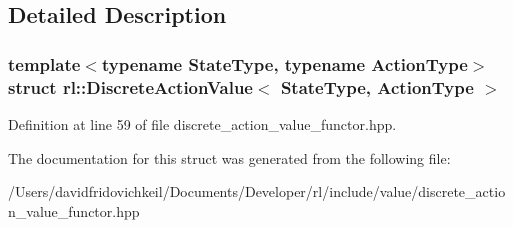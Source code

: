 \subsection{Detailed Description}
\subsubsection*{template$<$typename State\+Type, typename Action\+Type$>$\newline
struct rl\+::\+Discrete\+Action\+Value$<$ State\+Type, Action\+Type $>$}



Definition at line 59 of file discrete\+\_\+action\+\_\+value\+\_\+functor.\+hpp.



The documentation for this struct was generated from the following file\+:\begin{DoxyCompactItemize}
\item 
/\+Users/davidfridovichkeil/\+Documents/\+Developer/rl/include/value/discrete\+\_\+action\+\_\+value\+\_\+functor.\+hpp\end{DoxyCompactItemize}
